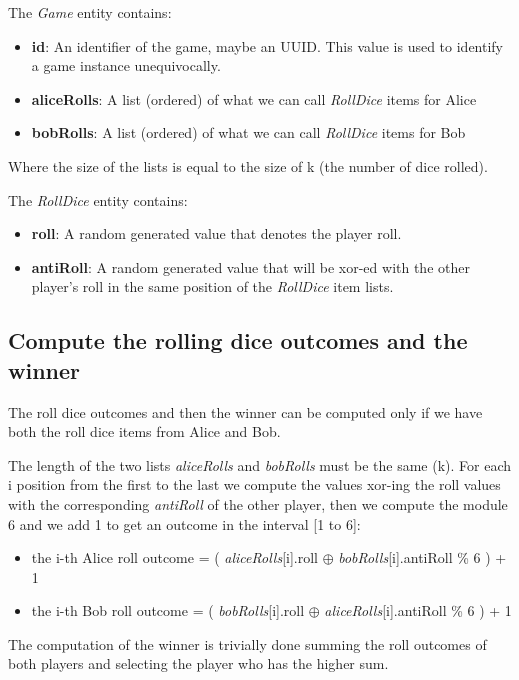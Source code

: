 \documentclass{article}
\begin{document}
\noindent The \emph{Game} entity contains:
\begin{itemize}
	\item \textbf{id}: An identifier of the game, maybe an UUID. This value is used to identify a game instance unequivocally.
	\item \textbf{aliceRolls}: A list (ordered) of what we can call \emph{RollDice} items for Alice
	\item \textbf{bobRolls}: A list (ordered) of what we can call \emph{RollDice} items for Bob
\end{itemize}

\noindent Where the size of the lists is equal to the size of k (the number of dice rolled).

\noindent The \emph{RollDice} entity contains:
\begin{itemize}
	\item \textbf{roll}: A random generated value that denotes the player roll.
	\item \textbf{antiRoll}: A random generated value that will be xor-ed with the other player's roll in the same position
	of the \emph{RollDice} item lists.
\end{itemize}

\subsection{Compute the rolling dice outcomes and the winner}

The roll dice outcomes and then the winner can be computed only if we
have both the roll dice items from Alice and Bob.

The length of the two lists \emph{aliceRolls} and \emph{bobRolls} must be the same (k).
For each i position from the first to the last we compute the values xor-ing the roll values
with the corresponding \emph{antiRoll} of the other player, then we compute the module 6
and we add 1 to get an outcome in the interval [1 to 6]:

\begin{itemize}
	\item the i-th Alice roll outcome = ( \emph{aliceRolls}[i].roll $\oplus$ \emph{bobRolls}[i].antiRoll \% 6 ) + 1
	\item the i-th Bob roll outcome = ( \emph{bobRolls}[i].roll $\oplus$ \emph{aliceRolls}[i].antiRoll \% 6 ) + 1
\end{itemize}	

The computation of the winner is trivially done summing the roll outcomes of both players and
selecting the player who has the higher sum.
\end{document}
